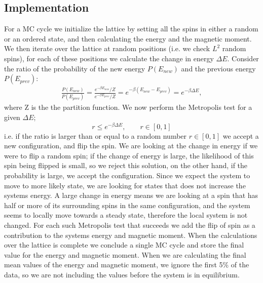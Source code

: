 \documentclass{emulateapj}
\begin{document}
\subsection{Implementation}
For a MC cycle we initialize the lattice by setting all the spins in either a random or an ordered state, and then calculating the energy and the magnetic moment. We then iterate over the lattice at random positions (i.e. we check $L^2$ random spins), for each of these positions we calculate the change in energy $\Delta E$. Consider the ratio of the probability of the new energy $P\left(E_{new}\right)$ and the previous energy $P\left(E_{prev}\right)$:
%
\begin{align*}
    \frac{P\left(E_{new}\right)}{P\left(E_{prev}\right)} = \frac{e^{-\beta E_{new}}/Z}{e^{-\beta E_{prev}}/Z} = e^{-\beta\left(E_{new} - E_{prev}\right)} = e^{-\beta\Delta E},
\end{align*}
%
where Z is the the partition function. We now perform the Metropolis test for a given $\Delta E$;
%
\begin{equation*}
    r \leq e^{-\beta \Delta E}, \qquad r \in [0,1]
\end{equation*}
%
i.e. if the ratio is larger than or equal to a random number $r \in [0,1]$ we accept a new configuration, and flip the spin.  We are looking at the change in energy if we were to flip a random spin; if the change of energy is large, the likelihood of this spin being flipped is small, so we reject this solution, on the other hand, if the probability is large, we accept the configuration. Since we expect the system to move to more likely state, we are looking for states that does not increase the systems energy. A large change in energy means we are looking at a spin that has half or more of its surrounding spins in the same configuration, and the system seems to locally move towards a steady state, therefore the local system is not changed. For each such Metropolis test that succeeds we add the flip of spin as a contribution to the systems energy and magnetic moment. When the calculations over the lattice is complete we conclude a single MC cycle and store the final value for the energy and magnetic moment. When we are calculating the final mean values of the energy and magnetic moment, we ignore the first 5\% of the data, so we are not including the values before the system is in equilibrium.
\end{document}

